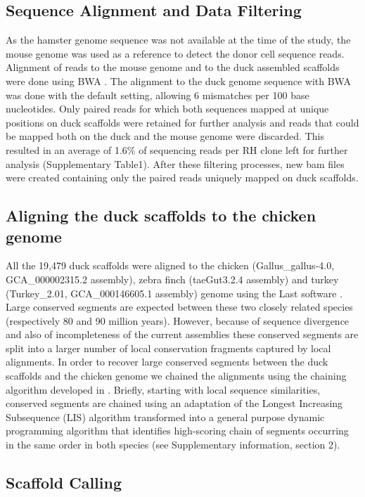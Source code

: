 \documentclass[10pt,letterpaper]{article}
\begin{document}
\subsection*{Sequence Alignment and Data Filtering}

As the hamster genome sequence was not available at the time of the study, the mouse genome was used as a reference to detect the donor cell sequence reads. Alignment of reads to the mouse genome and to the duck assembled scaffolds were done using BWA \cite{Li2010}. The alignment to the duck genome sequence with BWA was done with the default setting, allowing 6 mismatches per 100 base nucleotides. Only paired reads for which both sequences mapped at unique positions on duck scaffolds were retained for further analysis and reads that could be mapped both on the duck and the mouse genome were discarded. This resulted in an average of 1.6\% of sequencing reads per RH clone left for further analysis (Supplementary Table1). After these filtering processes, new bam files were created containing only the paired reads uniquely mapped on duck scaffolds.

\subsection*{Aligning the duck scaffolds to the chicken genome}

All the 19,479 duck scaffolds were aligned to the chicken (Gallus\_gallus-4.0, GCA\_000002315.2 assembly), zebra finch (taeGut3.2.4 assembly) and turkey (Turkey\_2.01, GCA\_000146605.1 assembly) genome using the Last software \cite{Frith2010}. Large conserved segments are expected between these two closely related species (respectively 80 and 90 million years). However, because of sequence divergence and also of incompleteness of the current assemblies these conserved segments are split into a larger number of local conservation fragments captured by local alignments. In order to recover large conserved segments between the duck scaffolds and the chicken genome we chained the alignments using the chaining algorithm developed in \cite{Courcelle2008}.  Briefly, starting with local sequence similarities, conserved segments are chained using an adaptation of the Longest Increasing Subsequence (LIS) algorithm transformed into a general purpose dynamic programming algorithm that identifies high-scoring chain of segments occurring in the same order in both species (see Supplementary information, section 2). 

\subsection*{Scaffold Calling}
\end{document}
